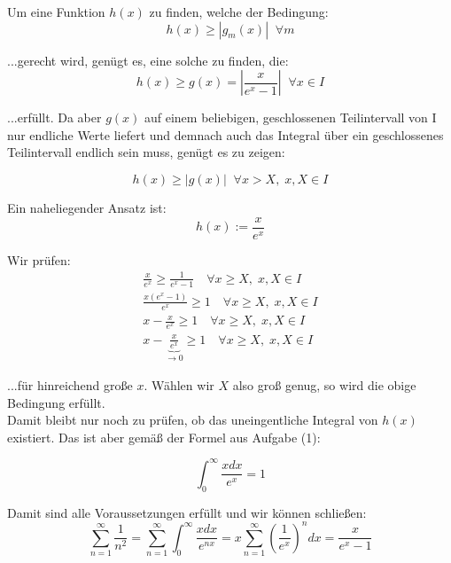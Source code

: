 \documentclass[a4paper,german,12pt,smallheadings]{scrartcl}
\begin{document}
Um eine Funktion $h(x)$ zu finden, welche der Bedingung:
\begin{equation*}
h(x) \geq |g_m(x)| \;\; \forall m
\end{equation*}

...gerecht wird, genügt es, eine solche zu finden, die:
\begin{equation*}
h(x)\geq g(x)=\left|\frac{x}{e^x-1}\right| \;\; \forall x \in I
\end{equation*}

...erfüllt. Da aber $g(x)$ auf einem beliebigen, geschlossenen Teilintervall von I nur endliche Werte liefert und demnach auch das Integral über ein geschlossenes Teilintervall endlich sein muss, genügt es zu zeigen:

\begin{equation*}
h(x) \geq |g(x)| \;\; \forall x>X, \; x,X\in I
\end{equation*}

Ein naheliegender Ansatz ist:
\begin{equation*}
h(x):=\frac{x}{e^x}
\end{equation*}

Wir prüfen:
\begin{align*}
\frac{x}{e^x} \geq \frac{1}{e^x-1} \quad \forall x\geq X, \; x,X\in I\\
\frac{x(e^x-1)}{e^x} \geq 1 \quad \forall x\geq X, \; x,X\in I\\
x-\frac{x}{e^x} \geq 1 \quad \forall x\geq X, \; x,X\in I\\
x-\underbrace{\frac{x}{e^x}}_{\rightarrow 0} \geq 1 \quad \forall x\geq X, \; x,X\in I
\end{align*}

...für hinreichend große $x$. Wählen wir $X$ also groß genug, so wird die obige Bedingung erfüllt.\\
Damit bleibt nur noch zu prüfen, ob das uneingentliche Integral von $h(x)$ existiert. Das ist aber gemäß der Formel aus Aufgabe (1):

\begin{equation*}
\int_{0}^{\infty}\frac{xdx}{e^x}=1
\end{equation*}

Damit sind alle Voraussetzungen erfüllt und wir können schließen:
\begin{equation*}
\sum_{n=1}^{\infty}\frac{1}{n^2}=\sum_{n=1}^{\infty}\int_{0}^{\infty}\frac{xdx}{e^{nx}}=x\sum_{n=1}^{\infty}\left(\frac{1}{e^x}\right)^ndx=\frac{x}{e^x-1}
\end{equation*}
\end{document}
